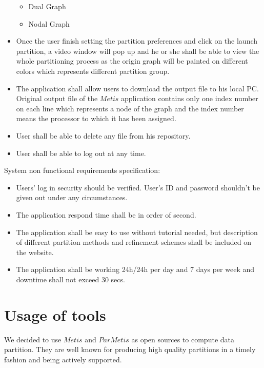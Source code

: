 \documentclass{cranfieldChart}
\begin{document}
\begin{itemize}
    \begin{itemize}
        \item Dual Graph
        \item Nodal Graph 
    \end{itemize}
    \item Once the user finish setting the partition preferences and click on the launch partition, a video window will pop up and he or she shall be able to view the whole partitioning process as the origin graph will be painted on different colors which represents different partition group. 
    \item The application shall allow users to download the output file to his local PC. Original output file of the $Metis$ application contains only one index number on each line which represents a node of the graph and the index number means the processor to which it has been assigned. 
    \item User shall be able to delete any file from his repository. 
    \item User shall be able to log out at any time. 
    \end{itemize}
    System non functional requirements specification: 
    \begin{itemize}
        \item Users' log in security should be verified. User's ID and password shouldn't be given out under any circumstances. 
        \item The application respond time shall be in order of second. 
        \item The application shall be easy to use without tutorial needed, but description of different partition methods and refinement schemes shall be included on the website. 
        \item The application shall be working 24h/24h per day and 7 days per week and downtime shall not exceed 30 secs. 
     \end{itemize}
\section{Usage of tools}
We decided to use $Metis$ and $ParMetis$ as open sources to compute data partition. They are well known for producing high quality partitions in a timely fashion and being actively supported. 
\end{document}
